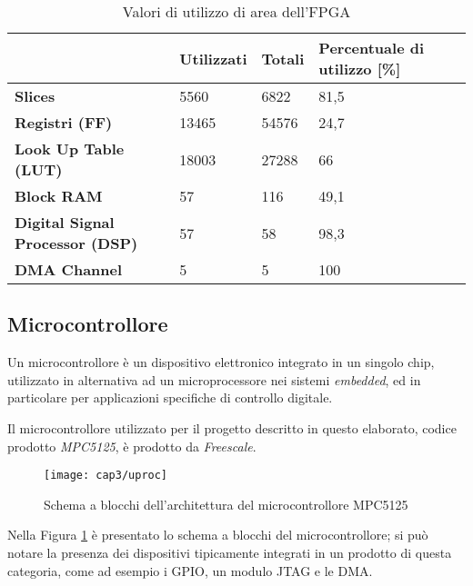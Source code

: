 \begin{table}[ht]
\centering
\begin{tabular}{l|l|l|l}
                                        & \textbf{Utilizzati} & \textbf{Totali} & \textbf{Percentuale di utilizzo {[}\%{]}} \\ \hline
\textbf{Slices}                         & 5560                & 6822            & 81,5                                      \\
\textbf{Registri (FF)}                  & 13465               & 54576           & 24,7                                      \\
\textbf{Look Up Table (LUT)}            & 18003               & 27288           & 66                                        \\
\textbf{Block RAM}                      & 57                  & 116             & 49,1                                      \\
\textbf{Digital Signal Processor (DSP)} & 57                  & 58              & 98,3                                      \\
\textbf{DMA Channel}                    & 5                   & 5               & 100                                      
\end{tabular}
\caption{Valori di utilizzo di area dell'FPGA}
\label{tabarea}
\end{table}

\subsection{Microcontrollore}
Un microcontrollore è un dispositivo elettronico integrato in un singolo chip, utilizzato in alternativa ad un microprocessore nei sistemi \textit{embedded}, ed in particolare per applicazioni specifiche di controllo digitale.

Il microcontrollore utilizzato per il progetto descritto in questo elaborato, codice prodotto \textit{MPC5125}, è prodotto da \textit{Freescale}. 

\begin{figure}  
  \begin{center}
    \texttt{[image: cap3/uproc]}
    \caption{Schema a blocchi dell'architettura del microcontrollore MPC5125}
    \label{uproc}
  \end{center}
\end{figure}

Nella Figura \ref{uproc} è presentato lo schema a blocchi del microcontrollore; si può notare la presenza dei dispositivi tipicamente integrati in un prodotto di questa categoria, come ad esempio i GPIO, un modulo JTAG e le DMA.

